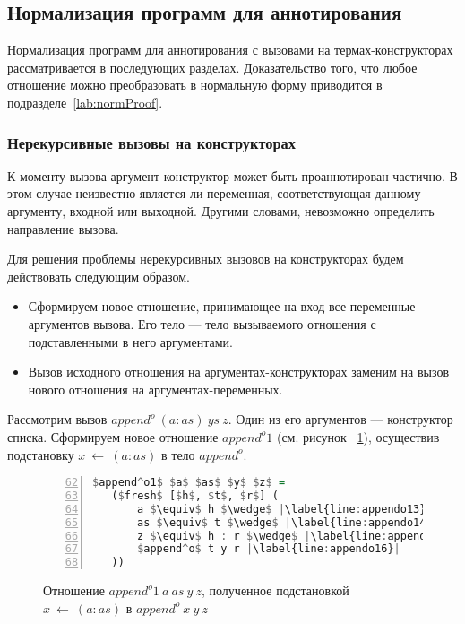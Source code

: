 \subsection{Нормализация программ для аннотирования}
\label{sec:normalize}

Нормализация программ для аннотирования с вызовами на термах-конструкторах рассматривается в последующих разделах.
Доказательство того, что любое отношение \miniKanren{} можно преобразовать в нормальную форму приводится в подразделе~\ref{lab:normProof}.


\subsubsection{Нерекурсивные вызовы на конструкторах}
\label{lab:non-rec}

К моменту вызова аргумент-конструктор может быть проаннотирован частично.
В этом случае неизвестно является ли переменная, соответствующая данному аргументу, входной или выходной.
Другими словами, невозможно определить направление вызова.

Для решения проблемы нерекурсивных вызовов на конструкторах будем действовать следующим образом.
\begin{itemize}
    \item Сформируем новое отношение, принимающее на вход все переменные аргументов вызова. Его тело --- тело вызываемого отношения с подставленными в него аргументами.
    \item Вызов исходного отношения на аргументах-конструкторах заменим на вызов нового отношения на аргументах-переменных.
\end{itemize}

Рассмотрим вызов $append^o~(a:as)~ys~z$.
Один из его аргументов --- конструктор списка.
Сформируем новое отношение $append^o1$ (см. рисунок ~\ref{lst:appendo1}), осуществив подстановку $x~\gets~(a:as)$ в тело $append^o$.

\begin{figure}[h!]
  \begin{center}
  \begin{minipage}{0.42\textwidth}
  \begin{lstlisting}[language=Haskell, frame=single, numbers=left,numberstyle=\small, firstnumber=62, escapechar=|]
 $append^o1$ $a$ $as$ $y$ $z$ =
   ($fresh$ [$h$, $t$, $r$] (
       a $\equiv$ h $\wedge$ |\label{line:appendo13}|
       as $\equiv$ t $\wedge$ |\label{line:appendo14}|
       z $\equiv$ h : r $\wedge$ |\label{line:appendo15}|
       $append^o$ t y r |\label{line:appendo16}|
   ))
    \end{lstlisting}
  \end{minipage}
  \end{center}
  \caption{Отношение $append^o1 \ a \ as \ y \ z$, полученное подстановкой $x~\gets~(a:as)$ в $append^o \ x \ y \ z$}
  \label{lst:appendo1}
\end{figure}

